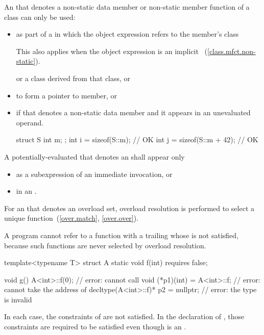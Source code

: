 \pnum
An  that denotes a non-static data member or
non-static member function of a class can only be used:
\begin{itemize}
\item as part of a  in which the
object expression
refers to the member's class
\begin{footnote}
This also applies when the object expression
is an implicit ~(\ref{class.mfct.non-static}).
\end{footnote}
or a class derived from
that class, or

\item to form a pointer to member, or

\item if that  denotes a non-static data member
and it appears in an unevaluated operand.
\begin{example}
\begin{codeblock}
struct S {
  int m;
};
int i = sizeof(S::m);           // OK
int j = sizeof(S::m + 42);      // OK
\end{codeblock}
\end{example}
\end{itemize}

\pnum
A potentially-evaluated 
that denotes an 
shall appear only
\begin{itemize}
\item as a subexpression of an immediate invocation, or
\item in an .
\end{itemize}

\pnum
For an  that denotes an overload set,
overload resolution is performed
to select a unique function~(\ref{over.match}, \ref{over.over}).
\begin{note}
A program cannot refer to a function
with a trailing 
whose  is not satisfied,
because such functions are never selected by overload resolution.
\begin{example}
\begin{codeblock}
template<typename T> struct A {
  static void f(int) requires false;
}

void g() {
  A<int>::f(0);                         // error: cannot call 
  void (*p1)(int) = A<int>::f;          // error: cannot take the address of 
  decltype(A<int>::f)* p2 = nullptr;    // error: the type  is invalid
}
\end{codeblock}
In each case, the constraints of  are not satisfied.
In the declaration of ,
those constraints are required to be satisfied
even though
 is an .
\end{example}
\end{note}

